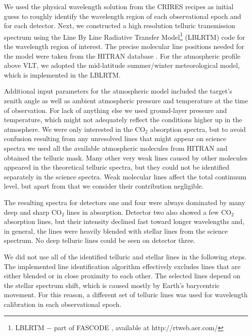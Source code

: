 \documentclass{aa}
\begin{document}
We used the physical wavelength solution from the CRIRES recipes as initial guess  to roughly
identify the wavelength region of each observational epoch and for each detector.
Next, we constructed a high resolution telluric transmission spectrum using the
Line By Line Radiative Transfer Model\footnote{LBLRTM $-$ part of FASCODE \citep{Clough1981,Clough1992}, available at http://rtweb.aer.com/} 
(LBLRTM) code for the wavelength region of interest.
The precise molecular line positions needed for the model were taken from the HITRAN database \citep{Rothman}.
For the atmospheric profile above VLT, we adopted the mid-latitude summer/winter meteorological model, which is implemented in the LBLRTM. 

Additional input parameters for the atmospheric model included the target's zenith angle
as well as ambient atmospheric pressure and temperature at the time of observation. For lack of
anything else we used ground-layer pressure and temperature, which might not adequately reflect
the conditions higher up in the atmosphere.
We were only interested  in the CO$_2$ absorption spectra,
but  to avoid confusion resulting from any unresolved lines that might appear on science spectra
we used all the available atmospheric molecules from HITRAN and obtained the telluric mask. 
Many other very weak lines caused by other molecules appeared in the theoretical telluric spectra, 
but they could not be identified separately in the science spectra.
Weak molecular lines affect the total continuum level, but apart from that we consider their contribution negligible.

The resulting spectra for detectors one and four were always dominated by many deep and sharp CO$_2$ 
lines in absorption. Detector two also showed a few CO$_2$ absorption lines, 
but their intensity declined fast toward longer wavelengths and, in general, the lines were heavily 
blended with stellar lines from the science spectrum. No deep telluric lines could be seen on detector three.

We did not use all of the identified telluric and stellar lines  in the following steps. 
The implemented line identification algorithm effectively excludes lines that are either blended or in close proximity to each other.
The selected lines depend on the stellar spectrum shift, which is caused mostly by Earth's barycentric movement.
For this reason, a different set of telluric lines was used for wavelength calibration in each observational epoch.
\end{document}
